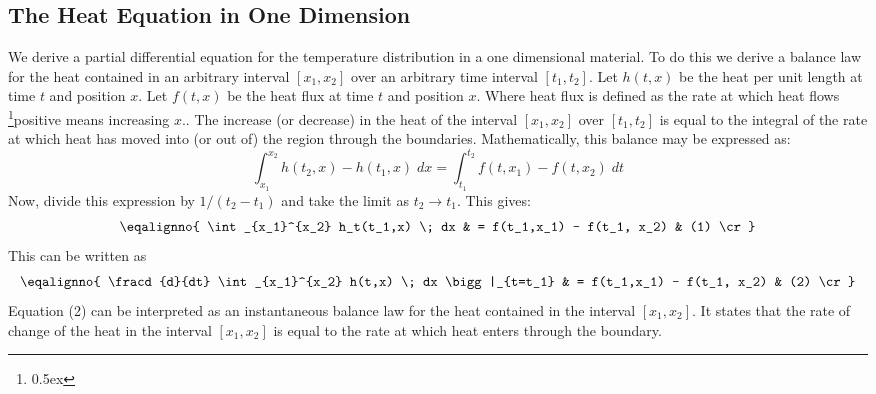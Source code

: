 \subsection{The Heat Equation in One Dimension}
We derive a partial differential equation for the temperature distribution 
in a one dimensional material. To do this we 
derive a balance law for the heat contained in an arbitrary interval 
$[x_1,x_2]$ over an arbitrary time interval $[t_1, t_2]$. 
Let $h(t,x)$ be the 
heat per unit length at time $t$ and position $x$. Let 
$f(t,x)$ be the heat flux at time $t$ and position $x$. Where heat 
flux is defined as the rate at which heat flows
\footnote{\kern -2pt \raise 0.5ex \hbox{\dag}}{positive means 
increasing $x$.}. The increase (or decrease) in 
the heat of 
the interval $[x_1, x_2]$ over $[t_1, t_2]$ is equal to the integral of
the rate at 
which heat has moved into (or out of) the region through the boundaries.
Mathematically, this balance may be expressed as:
$$
\int_{x_1}^{x_2} h(t_2,x) - h(t_1,x) \; dx  = 
\int_{t_1}^{t_2} f(t, x_1) - f(t,x_2) \; dt
$$
Now, divide this expression by $1 / (t_2 - t_1)$ and take the 
limit as $t_2 \rightarrow t_1$. This gives:
$$
\eqalignno{
\int_{x_1}^{x_2} h_t(t_1,x) \; dx & = f(t_1,x_1) - f(t_1, x_2) & (1) \cr}
$$
This can be written as
$$
\eqalignno{
\fracd{d}{dt} \int_{x_1}^{x_2} h(t,x) \; dx \bigg|_{t=t_1} & 
= f(t_1,x_1) - f(t_1, x_2) 
& (2) \cr}
$$
Equation (2) can be interpreted as an instantaneous balance law for the 
heat contained in the interval $[x_1, x_2]$. It states that the rate of 
change of the heat in the interval $[x_1, x_2]$ is equal to the rate 
at which heat enters through the boundary.


